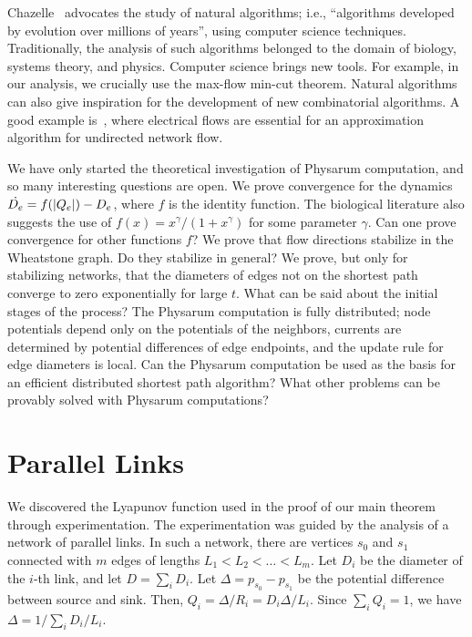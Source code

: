 \documentclass[11pt,a4paper]{article}
\renewcommand{\source}{\ensuremath{s_0}}
\renewcommand{\sink}{\ensuremath{s_1}}
\begin{document}
Chazelle~\cite{Chazelle-NaturalAlgorithms} advocates the study of natural
algorithms; i.e., ``algorithms developed by evolution over millions of years'',
using computer science techniques. Traditionally, the analysis of such
algorithms belonged to the domain of biology, systems theory, and physics. Computer
science brings new tools. For example, in our analysis, we crucially use the
max-flow min-cut theorem.  
Natural algorithms can also give inspiration for the development of new
combinatorial algorithms. A good example is~\cite{Christiano-et-al}, where
electrical flows are essential for an approximation algorithm for undirected
network flow. 

We have only started the theoretical investigation of Physarum
computation, and so many interesting questions are open. We prove convergence for the
dynamics $\dot{D_e} = f(| Q_e |) - D_e$, where $f$ is the identity
function. The biological literature also suggests the use of $f(x) =
x^\gamma/(1 + x^\gamma)$ for some parameter $\gamma$. Can one prove convergence for
other functions $f$? We prove that flow directions stabilize in the Wheatstone
graph. Do they stabilize in general? We prove, but only for stabilizing networks, that
the diameters of edges not on the shortest path converge to zero exponentially
for large $t$. What can be said about the initial stages of the process? 
The Physarum computation is fully distributed; node potentials depend only on
the potentials of the neighbors, currents are determined by potential
differences of edge endpoints, and the update rule for edge diameters is
local. Can the Physarum computation be used as the basis for an efficient
distributed shortest path algorithm? What other problems can be provably solved
with Physarum computations?

\section{Parallel Links}\label{sec: parallel links}

We discovered the Lyapunov function used in the proof of our main theorem
through experimentation. The experimentation was guided by the analysis of a
network of parallel links. In such a network, there are vertices $\source$ and
$\sink$ connected with $m$ edges of lengths $L_1 < L_2 < \ldots < L_m$. Let $D_i$ be the
diameter of the $i$-th link, and let $D = \sum_i D_i$. Let
$\Delta = p_{\source} - p_{\sink}$ be the potential difference between source and
sink. Then, $Q_i = \Delta/R_i = D_i \Delta/ L_i$. Since $\sum_i Q_i = 1$, we
have $\Delta = 1/\sum_i D_i/L_i$. 
\end{document}
